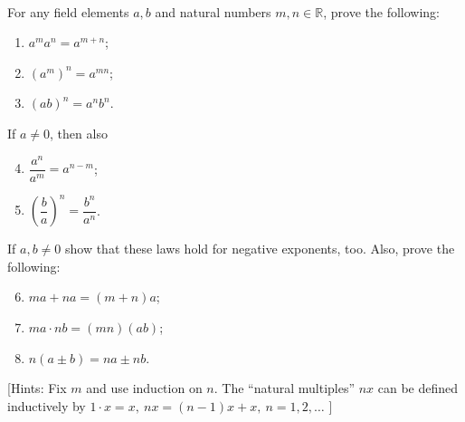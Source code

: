 \documentclass[12pt]{book}
\theoremstyle{definition}
\begin{document}
\begin{ex}[11]
\\
For any field elements $a,b$ and natural numbers $m,n \in \mathbb{R}$, prove the following:
\begin{multicols}{3}
\begin{enumerate}[label=(\Roman*)]
	\item $a^ma^n= a^{m+n}$;
	\item $(a^m)^n =a ^{mn}$;
	\item $(ab)^n = a^nb^n$.
\end{enumerate}
\end{multicols}
If $a \neq 0$, then also
\begin{multicols}{2}
\begin{enumerate}[label = (\Roman*)]
	\setcounter{enumi}{3}
	\item $\dfrac{a^n}{a^m} = a^{n-m}$; 
	\item $\left( \dfrac{b}{a} \right)^n = \dfrac{b^n}{a^n}$.
\end{enumerate}
\end{multicols}
If $a,b \neq 0$ show that these laws hold for negative exponents, too. Also, prove the following:
\begin{multicols}{3}
\begin{enumerate}[label = (\Roman*)]
	\setcounter{enumi}{5}
	\item $ma+na = (m+n)a$;
	\item $ma \cdot nb = (mn)(ab)$;
	\item $n(a\pm b) = na \pm nb$. 
\end{enumerate}
\end{multicols}
[Hints: Fix $m$ and use induction on $n$. The ``natural multiples'' $nx$ can be defined inductively by $1\cdot x= x,\: nx  =(n-1)x +x, \: n=1,2, \ldots$ ]	
\end{ex}
\end{document}

